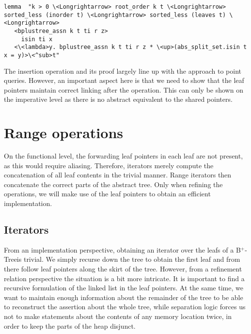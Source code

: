 \documentclass[a4paper,UKenglish,cleveref, autoref, thm-restate]{lipics-v2021}
\newcommand{\btree}{B$^+$-Tree}
\begin{document}
\begin{lstlisting}[mathescape=true, language=Isabelle,label=lst:isin-refines]
lemma  "k > 0 \<Longrightarrow> root_order k t \<Longrightarrow> sorted_less (inorder t) \<Longrightarrow> sorted_less (leaves t) \<Longrightarrow>
   <bplustree_assn k t ti r z>
     isin ti x
   <\<lambda>y. bplustree_assn k t ti r z * \<up>(abs_split_set.isin t x = y)>\<^sub>t"
\end{lstlisting}

The insertion operation and its proof largely line up with the approach to point queries.
However, an important aspect here is that we need to show that the leaf pointers
maintain correct linking after the operation.
This can only be shown on the imperative level as there is no abstract equivalent
to the shared pointers.


%
%
%


\section{Range operations}
\label{sec:range}

On the functional level, the forwarding leaf pointers in each leaf
are not present, as this would require aliasing.
Therefore, iterators merely compute the concatenation
of all leaf contents in the trivial manner.
Range iterators then concatenate the correct parts of the
abstract tree.
Only when refining the operations, we will make use of the leaf pointers
to obtain an efficient implementation.

\subsection{Iterators}
\label{sec:imperative_iter}

From an implementation perspective, obtaining an iterator over the leafs
of a \btree is trivial.
We simply recurse down the tree to obtain the first leaf and from there follow leaf
pointers along the skirt of the tree.
However, from a refinement relation perspective the situation is a bit more intricate.
It is important to find a recursive formulation of the linked list in the leaf pointers.
At the same time, we want to maintain enough information about the remainder of the tree
to be able to reconstruct the assertion about the whole tree,
while separation logic forces us not to make statements about the contents of any memory location twice,
in order to keep the parts of the heap disjunct.
\end{document}

